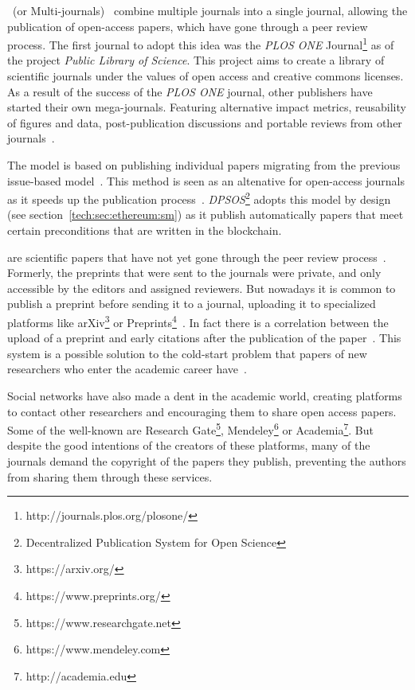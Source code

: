 ~(or Multi-journals)~\cite{binfield2013open,wellen2013open}
combine multiple journals into a single journal, allowing the publication of
open-access papers, which have gone through a peer review process. The first
journal to adopt this idea was the \emph{PLOS ONE}
Journal\footnote{http://journals.plos.org/plosone/} as of the project
\emph{Public Library of Science}. This project aims to create a library of
scientific journals under the values of open access and creative commons
licenses. As a result of the success of the \emph{PLOS ONE} journal, other
publishers have started their own mega-journals. Featuring alternative impact
metrics, reusability of figures and data, post-publication discussions and
portable reviews from other journals~\cite{bjork2015have}.

The  model is based on publishing individual papers
migrating from the previous issue-based model~\cite{anderton2013continuous}.
This method is seen as an altenative for open-access journals as it speeds up
the publication process~\cite{haymanview}. \emph{DPSOS}\footnote{Decentralized
  Publication System for Open Science} adopts this model by design (see
section~\ref{tech:sec:ethereum:sm}) as it publish automatically papers that meet
certain preconditions that are written in the blockchain.

 are scientific papers that have not yet gone through the peer
review process~\cite{harnad2003electronic}. Formerly, the preprints that were
sent to the journals were private, and only accessible by the editors and
assigned reviewers. But nowadays it is common to publish a preprint before
sending it to a journal, uploading it to specialized platforms like
arXiv\footnote{https://arxiv.org/} or
Preprints\footnote{https://www.preprints.org/}~\cite{brown2001volution}. In fact
there is a correlation between the upload of a preprint and early citations
after the publication of the paper~\cite{shuai2012scientific}. This system is a
possible solution to the cold-start problem that papers of new researchers who
enter the academic career have~\cite{sugiyama2010scholarly}.

Social networks have also made a dent in the academic world, creating platforms
to contact other researchers and encouraging them to share open access papers.
Some of the well-known are Research Gate\footnote{https://www.researchgate.net},
Mendeley\footnote{https://www.mendeley.com} or
Academia\footnote{http://academia.edu}. But despite the good intentions of the
creators of these platforms, many of the journals demand the copyright of the
papers they publish, preventing the authors from sharing them through these
services.


